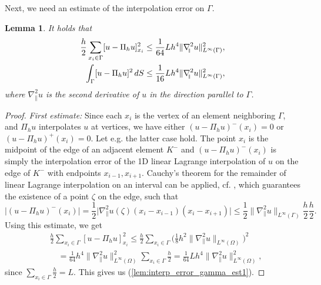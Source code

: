 \documentclass{article}
\newtheorem{lemma}{Lemma}
\theoremstyle{remark}
\def \d {{\rm d}}
\def\dS{\,\d S }
\def\gradt{\nabla_{\!\!{\scriptscriptstyle\parallel}}}
\begin{document}
Next, we need an estimate of the interpolation error on $\Gamma$.

\begin{lemma}
\label{lem:interp_error_gamma}
It holds that
\begin{align}
\label{lem:interp_error_gamma_est1}
\frac{h}{2}\sum_{x_i\in\Gamma}[u-\Pi_h u]_{x_i}^2 &\leq \frac{1}{64}L h^4 \|\gradt^2 u\|_{L^\infty(\Gamma)}^2,\\
\label{lem:interp_error_gamma_est2}
\int_\Gamma[u-\Pi_h u]^2\dS &\leq \frac{1}{16}L h^4 \|\gradt^2 u\|_{L^\infty(\Gamma)}^2,
\end{align}
where $\gradt^2 u$ is the second derivative of $u$ in the direction parallel to $\Gamma$.
\end{lemma}
\begin{proof}
\textit{First estimate:} Since each $x_i$ is the vertex of an element neighboring $\Gamma$, and $\Pi_h u$ interpolates $u$ at vertices, we have either $(u-\Pi_h u)^-(x_i)=0$ or $(u-\Pi_h u)^+(x_i)=0$. Let e.g. the latter case hold. The point $x_i$ is the midpoint of the edge of an adjacent element $K^-$ and $(u-\Pi_h u)^-(x_i)$ is simply the interpolation error of the 1D linear Lagrange interpolation of $u$ on the edge of $K^-$ with endpoints $x_{i-1},x_{i+1}$. Cauchy's theorem for the remainder of linear Lagrange interpolation on an interval can be applied, cf. \cite{Davis}, which guarantees the existence of a point $\zeta$ on the edge, such that
\begin{equation}
\big|(u-\Pi_h u)^-(x_i)\big| = \frac{1}{2} \big|\gradt^2 u(\zeta) (x_i-x_{i-1})(x_i-x_{i+1})\big| \leq \frac{1}{2} \|\gradt^2 u\|_{L^\infty(\Gamma)}\frac{h}{2} \frac{h}{2}.
\end{equation}
Using this estimate, we get 
\begin{equation}
\begin{split}
&\frac{h}{2}\sum_{x_i\in\Gamma}[u-\Pi_h u]_{x_i}^2 \leq \frac{h}{2}\sum_{x_i\in\Gamma} \big(\tfrac{1}{8}h^2\|\gradt^2 u\|_{L^\infty(\Omega)}\big)^2\\ &\quad =\frac{1}{64}h^4\|\gradt^2 u\|_{L^\infty(\Omega)}^2 \sum_{x_i\in\Gamma}\frac{h}{2}  =\frac{1}{64}L h^4 \|\gradt^2 u\|_{L^\infty(\Omega)}^2,
\end{split}
\end{equation}
since $\sum_{x_i\in\Gamma}\frac{h}{2}=L$. This gives us (\ref{lem:interp_error_gamma_est1}).


\end{proof}
\end{document}
